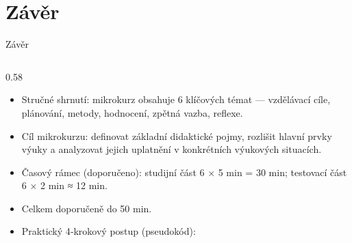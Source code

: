\documentclass[aspectratio=169]{beamer}
\begin{document}
\section{Závěr}
\begin{frame}{Závěr}
\begin{columns}[T,onlytextwidth]
\begin{column}{0.58\textwidth}
\scriptsize
\begin{itemize}

\tightlist

\item

  Stručné shrnutí: mikrokurz obsahuje 6 klíčových témat --- vzdělávací cíle, plánování, metody, hodnocení, zpětná vazba, reflexe.

\end{itemize}


\begin{itemize}

\tightlist

\item

  Cíl mikrokurzu: definovat základní didaktické pojmy, rozlišit hlavní prvky výuky a analyzovat jejich uplatnění v konkrétních výukových situacích.

\end{itemize}


\begin{itemize}

\tightlist

\item

  Časový rámec (doporučeno): studijní část 6 × 5 min = 30 min; testovací část 6 × 2 min ≈ 12 min.

\end{itemize}


\begin{itemize}

\tightlist

\item

  Celkem doporučeně do 50 min.

\end{itemize}


\begin{itemize}

\tightlist

\item

  Praktický 4‑krokový postup (pseudokód):


\end{itemize}
\end{column}
\end{columns}
\end{frame}
\end{document}
